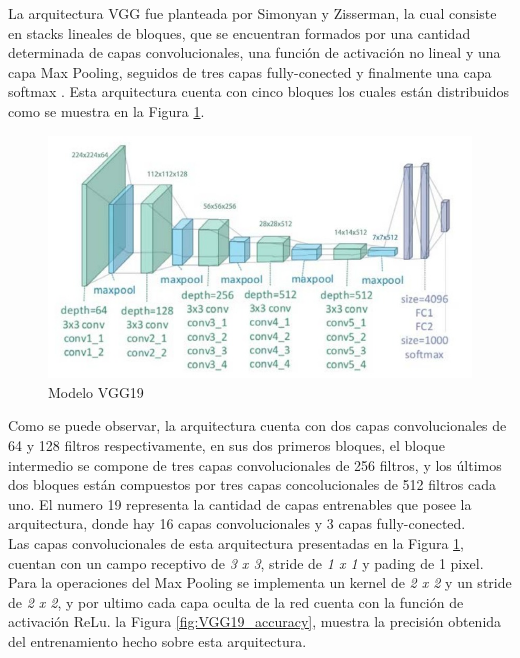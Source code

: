 La arquitectura VGG fue planteada por Simonyan y Zisserman, la cual consiste en stacks lineales de bloques, que se encuentran formados por una cantidad determinada de capas convolucionales, una función de activación no lineal y una capa Max Pooling, seguidos de tres capas fully-conected y finalmente una capa softmax \cite{ref_2}. Esta arquitectura cuenta con cinco bloques los cuales están distribuidos como se muestra en la Figura \ref{fig:VGG19}.				

\newpage
\begin{figure}[ht]
	\centering
	\includegraphics[scale=0.38]{Figs/22.jpeg}
	\caption{Modelo VGG19}
	\label{fig:VGG19}
\end{figure}			


Como se puede observar, la arquitectura cuenta con dos capas convolucionales de 64 y 128 filtros respectivamente, en sus dos primeros bloques, el bloque intermedio se compone de tres capas convolucionales de 256 filtros, y los últimos dos bloques están compuestos por tres capas concolucionales de 512 filtros cada uno. El numero 19 representa la cantidad de capas entrenables que posee la arquitectura, donde hay 16 capas convolucionales y 3 capas fully-conected.\\			

Las capas convolucionales de esta arquitectura presentadas en la Figura \ref{fig:VGG19}, cuentan con un campo receptivo de \textit{3 x 3}, stride de \textit{1 x 1} y pading de 1 pixel. Para la operaciones del Max Pooling se implementa un kernel de \textit{2 x 2} y un stride de \textit{2 x 2}, y por ultimo cada capa oculta de la red cuenta con la función de activación ReLu. la Figura \ref{fig:VGG19_accuracy}, muestra la precisión obtenida del entrenamiento hecho sobre esta arquitectura.


